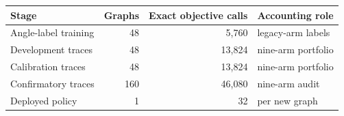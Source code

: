 \begin{tabular}{@{}lrrl@{}}
\toprule
Stage & Graphs & Exact objective calls & Accounting role \\
\midrule
Angle-label training & 48 & 5,760 & legacy-arm labels \\
Development traces & 48 & 13,824 & nine-arm portfolio \\
Calibration traces & 48 & 13,824 & nine-arm portfolio \\
Confirmatory traces & 160 & 46,080 & nine-arm audit \\
Deployed policy & 1 & 32 & per new graph \\
\bottomrule
\end{tabular}
